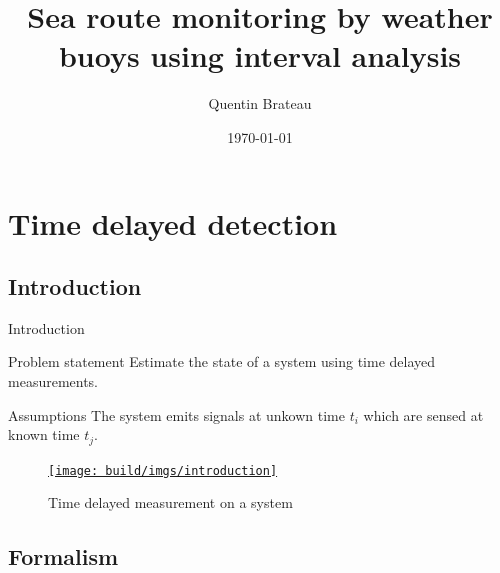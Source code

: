 \documentclass{beamer}
\title{Sea route monitoring by weather buoys using interval analysis}
\date{\today}
\author{Quentin Brateau}
\institute{ENSTA Bretagne}
\begin{document}
    \maketitle
    
    \section{Time delayed detection}

        \subsection{Introduction}

            \begin{frame}{Introduction}
                \begin{minipage}{0.45\textwidth}
                    \begin{block}{Problem statement}
                        Estimate the state of a system using time delayed measurements.
                    \end{block}
                    \begin{block}{Assumptions}
                        The system emits signals at unkown time $t_i$ which are sensed at known time $t_j$.
                    \end{block}
                \end{minipage}
                \hfill
                \begin{minipage}{0.5\textwidth}
                    \begin{figure}
                        \centering
                        \href{run:introduction.mp4?autostart&loop}{\texttt{[image: build/imgs/introduction]}}
                        \caption{Time delayed measurement on a system}
                    \end{figure}
                \end{minipage}
            \end{frame}

        \subsection{Formalism}
\end{document}

